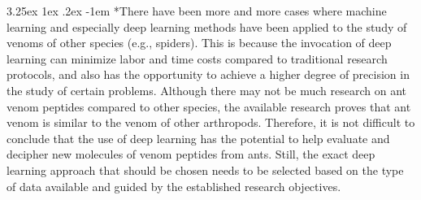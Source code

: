 \documentclass{article}
\makeatletter
\renewcommand\paragraph{\@startsection{paragraph}{4}{\z@}%
	{3.25ex \@plus1ex \@minus.2ex}%
	{-1em}%
	{\normalfont\normalsize}}
\makeatother
\begin{document}
		\paragraph*{There have been more and more cases where machine learning and especially deep learning methods have been applied to the study of venoms of other species (e.g., spiders). This is because the invocation of deep learning can minimize labor and time costs compared to traditional research protocols, and also has the opportunity to achieve a higher degree of precision in the study of certain problems. Although there may not be much research on ant venom peptides compared to other species, the available research proves that ant venom is similar to the venom of other arthropods. Therefore, it is not difficult to conclude that the use of deep learning has the potential to help evaluate and decipher new molecules of venom peptides from ants. Still, the exact deep learning approach that should be chosen needs to be selected based on the type of data available and guided by the established research objectives.}
		
		\newpage
		
\end{document}
